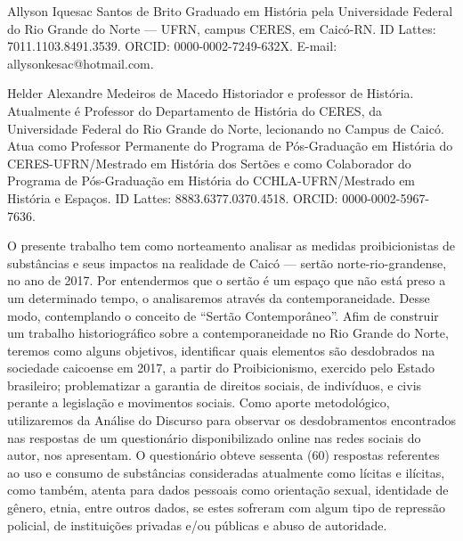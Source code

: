 \begin{refsection}
    \renewcommand{\thefigure}{\arabic{figure}}
    
    \label{chap:contextosubs}
    
    \articleAuthor
    {Allyson Iquesac Santos de Brito}
    {Graduado em História pela Universidade Federal do Rio Grande do Norte --- UFRN, campus CERES, em Caicó-RN. ID Lattes: 7011.1103.8491.3539. ORCID: 0000-0002-7249-632X. E-mail: allysonkesac@hotmail.com.}

    \articleAuthor
    {Helder Alexandre Medeiros de Macedo}
    {Historiador e professor de História. Atualmente é Professor do Departamento de História do CERES, da Universidade Federal do Rio Grande do Norte, lecionando no Campus de Caicó. Atua como Professor Permanente do Programa de Pós-Graduação em História do CERES-UFRN/Mestrado em História dos Sertões e como Colaborador do Programa de Pós-Graduação em História do CCHLA-UFRN/Mestrado em História e Espaços. ID Lattes: 8883.6377.0370.4518. ORCID: 0000-0002-5967-7636.}
    
    \begin{galoResumo}
        O presente trabalho tem como norteamento analisar as medidas proibicionistas de substâncias e seus impactos na realidade de Caicó --- sertão norte-rio-grandense, no ano de 2017. Por entendermos que o sertão é um espaço que não está preso a um determinado tempo, o analisaremos através da contemporaneidade. Desse modo, contemplando o conceito de ``Sertão Contemporâneo''. Afim de construir um trabalho historiográfico sobre a contemporaneidade no Rio Grande do Norte, teremos como alguns objetivos, identificar quais elementos são desdobrados na sociedade caicoense em 2017, a partir do Proibicionismo, exercido pelo Estado brasileiro; problematizar a garantia de direitos sociais, de indivíduos, e civis perante a legislação e movimentos sociais. Como aporte metodológico, utilizaremos da Análise do Discurso para observar os desdobramentos encontrados nas respostas de um questionário disponibilizado online nas redes sociais do autor, nos apresentam. O questionário obteve sessenta (60) respostas referentes ao uso e consumo de substâncias consideradas atualmente como lícitas e ilícitas, como também, atenta para dados pessoais como orientação sexual, identidade de gênero, etnia, entre outros dados, se estes sofreram com algum tipo de repressão policial, de instituições privadas e/ou públicas e abuso de autoridade.
    \end{galoResumo}
    

\end{refsection}
